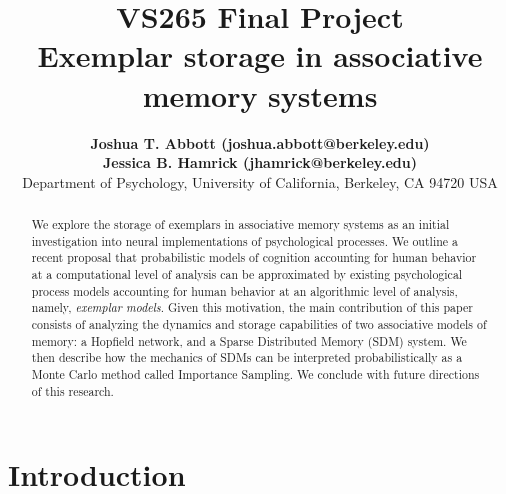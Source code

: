 \documentclass[10pt,letterpaper]{article}
\title{{\bf VS265 Final Project}\\Exemplar storage in associative memory systems}
\author{{\large \bf Joshua T. Abbott (joshua.abbott@berkeley.edu)\footnoteremember{myfootnote}{The authors contributed equally to this work.}} \\
 {\large \bf Jessica B. Hamrick (jhamrick@berkeley.edu)\footnoterecall{myfootnote}} \\
  Department of Psychology, University of California, Berkeley, CA 94720 USA}
\date{}
\begin{document}
\maketitle

\begin{abstract}
We explore the storage of exemplars in associative memory systems as an initial investigation into neural implementations of psychological processes. We outline a recent proposal that probabilistic models of cognition accounting for human behavior at a computational level of analysis can be approximated by existing psychological process models accounting for human behavior at an algorithmic level of analysis, namely, \textit{exemplar models}. Given this motivation, the main contribution of this paper consists of analyzing the dynamics and storage capabilities of two associative models of memory: a Hopfield network, and a Sparse Distributed Memory (SDM) system. We then describe how the mechanics of SDMs can be interpreted probabilistically as a Monte Carlo method called Importance Sampling. We conclude with future directions of this research. 

\end{abstract}

\section{Introduction}

\cite{griffiths2010probabilistic,tenenbaum2011grow}

\cite{kahneman1972subjective,gigerenzer2000simple}

\cite{marr82,anderson90}

\cite{sanborn2010rational,griffiths2012bridging}

\cite{Shi2010}

\end{document}
